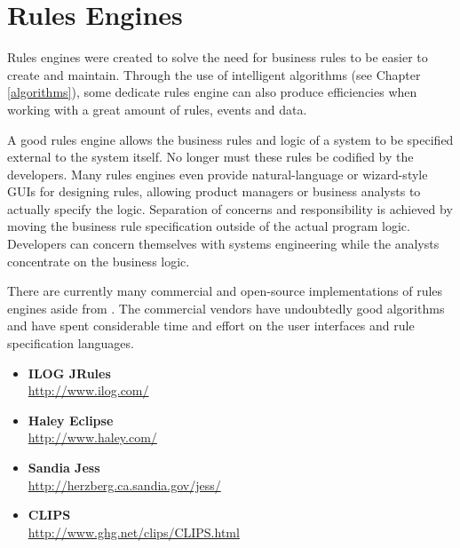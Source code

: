 \section{Rules Engines}

Rules engines were created to solve the need for business rules
to be easier to create and maintain. Through the use of intelligent
algorithms (see Chapter \vref{algorithms}), some dedicate rules engine
can also produce efficiencies when working with a great amount of
rules, events and data.

A good rules engine allows the business rules and logic of a system
to be specified external to the system itself.  No longer must these
rules be codified by the developers.  Many rules engines even provide
natural-language or wizard-style GUIs for designing rules, allowing
product managers or business analysts to actually specify the logic.
Separation of concerns and responsibility is achieved by moving the 
business rule specification outside of the actual program logic.
Developers can
concern themselves with systems engineering while the analysts 
concentrate on the business logic.

There are currently many commercial and open-source implementations
of rules engines aside from \drools{}.  The commercial
vendors have undoubtedly good algorithms and have spent considerable
time and effort on the user interfaces and rule specification
languages.

\begin{itemize}
	\item \textbf{\textsf{ILOG JRules}}\\
		 \url{http://www.ilog.com/}
	\item \textbf{\textsf{Haley Eclipse}}\\
		 \url{http://www.haley.com/}
	\item \textbf{\textsf{Sandia Jess}}\\
		 \url{http://herzberg.ca.sandia.gov/jess/}
	\item \textbf{\textsf{CLIPS}}\\
		 \url{http://www.ghg.net/clips/CLIPS.html}
\end{itemize}


